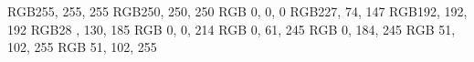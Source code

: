 \newcommand{\en}{\selectlanguage{english}}
\newcommand{\gr}{\selectlanguage{greek}}

\newcommand\PlaceText[3]{%
\begin{tikzpicture}[remember picture,overlay]
\node[outer sep=0pt,inner sep=0pt,anchor=south west] 
  at ([xshift=#1,yshift=-#2]current page.north west) {#3};
\end{tikzpicture}%

}
\definecolor{kWhite}         {RGB}{255, 255, 255}
\definecolor{kSnow}          {RGB}{250, 250, 250}
\definecolor{kBlack}         {RGB}{  0,   0,   0}
\definecolor{kPink}          {RGB}{227,  74, 147}
\definecolor{kGray}          {RGB}{192, 192, 192}
\definecolor{kNavyBlue}      {RGB}{28 , 130, 185}
\definecolor{kDarkBlue}      {RGB}{  0,   0, 214}
\definecolor{kLightBlue}     {RGB}{  0,  61, 245}
\definecolor{kvLightBlue}    {RGB}{  0, 184, 245}
\definecolor{kMyBlue}        {RGB}{ 51, 102, 255}
\definecolor{kBlue}          {RGB}{ 51, 102, 255}

